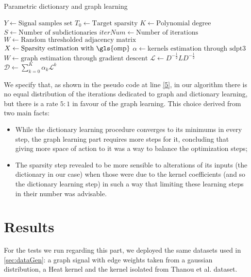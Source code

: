 \begin{algorithm}[htbp]
  \caption{Parametric dictionary and graph learning}
  \begin{algorithmic}[1]
      \State $Y \gets \text{Signal samples set}$
      \State $T_0\gets \text{Target sparsity}$
      \State $K \gets \text{Polynomial degree}$
      \State $S \gets \text{Number of subdictionaries}$
      \State $iterNum \gets \text{Number of iterations}$
      \State $W \gets \text{Random thresholded adjacency matrix}$
    \EndProcedure
        \State $X \gets \text{Sparsity estimation with \gls{omp}}$
      \EndProcedure
         \label{5}
          \State $\alpha \gets \text{kernels estimation through sdpt3}$
        \Else
          \State $W \gets \text{graph estimation through gradient descent}$
          \State $\mathcal{L} \gets D^{-\frac{1}{2}}LD^{-\frac{1}{2}}$
        \EndIf
      \EndProcedure
        \State $\mathcal{D} \gets \sum_{k=0}^K \alpha_k \mathcal{L}^k$
      \EndProcedure
    \EndFor
    \end{algorithmic}
  \label{eq:GDSimple}
\end{algorithm}

We specify that, as shown in the pseudo code at line \ref{5}, in our algorithm there is no equal distribution of the iterations dedicated to graph and dictionary learning, but there is a rate $5:1$ in favour of the graph learning. This choice derived from two main facts:
\begin{itemize}
\item While the dictionary learning procedure converges to its minimums in every step, the graph learning part requires more steps for it, concluding that giving more space of action to it was a way to balance the optimization steps;
\item The sparsity step revealed to be more sensible to alterations of its inputs (the dictionary in our case) when those were due to the kernel coefficients (and so the dictionary learning step) in such a way that limiting these learning steps in their number was advisable.
\end{itemize}

\section{Results}
For the tests we run regarding this part, we deployed the same datasets used in \autoref{sec:dataGen}: a graph signal with edge weights taken from a gaussian distribution, a Heat kernel and the kernel isolated from Thanou et al. dataset.

